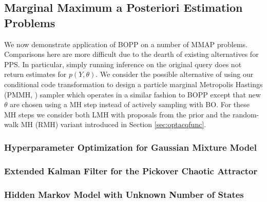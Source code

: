 \subsection{Marginal Maximum a Posteriori Estimation Problems}

We now demonstrate application of BOPP on a number of MMAP problems.  Comparisons here are more difficult due to the dearth of existing alternatives for PPS.  In particular, simply running inference on the original query does not return estimates for $p\left(Y,\theta\right)$.  We consider the possible alternative of using our conditional code transformation to design a particle marginal Metropolis Hastings (PMMH, \cite{andrieu2010particle}) sampler which operates in a similar fashion to BOPP except that new $\theta$ are chosen using a MH step instead of actively sampling with BO.
For these MH steps we consider both LMH \citep{wingate2011lightweight} with proposals from the prior and the random-walk MH (RMH) variant introduced in Section \ref{sec:optacqfunc}.

\subsubsection{Hyperparameter Optimization for Gaussian Mixture Model}



\subsubsection{Extended Kalman Filter for the Pickover Chaotic Attractor}
\label{sec:AppKalman}



\subsubsection{Hidden Markov Model with Unknown Number of States}


